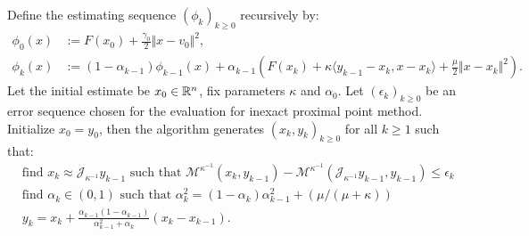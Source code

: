 \documentclass[12pt]{article}
\begin{document}
    \begin{definition}
        Define the estimating sequence $(\phi_k)_{k \ge0}$ recursively by: 
        \begin{align*}
            \phi_0(x) &:= F(x_0) + \frac{\gamma_0}{2}\Vert x - v_0\Vert^2, 
            \\
            \phi_k(x) &:= 
            (1 - \alpha_{k - 1})\phi_{k - 1}(x)
            + \alpha_{k - 1}\left(
                F(x_k) + \kappa\langle y_{k - 1} - x_k, x - x_k \rangle
                + \frac{\mu}{2}\Vert x - x_k\Vert^2
            \right). 
        \end{align*}
        Let the initial estimate be $x_0 \in \mathbb R^n$, fix parameters $\kappa$ and $\alpha_0$. 
        Let $(\epsilon_k)_{k \ge 0}$ be an error sequence chosen for the evaluation for inexact proximal point method. 
        Initialize $x_0 = y_0$, then the algorithm generates $(x_k, y_k)_{k\ge 0}$ for all $k \ge 1$ such that: 
        \begin{align*}
            & \text{find } x_k \approx \mathcal J_{\kappa^{-1}} y_{k - 1} \text{ such that } \mathcal M^{\kappa^{-1}}(x_k, y_{k - 1}) - \mathcal M^{\kappa^{-1}}(\mathcal J_{\kappa^{-1}}y_{k - 1}, y_{k - 1}) \le \epsilon_k
            \\
            & \text{find } \alpha_k \in (0, 1) \text{ such that } \alpha_k^2 = (1 - \alpha_k)\alpha_{k - 1}^2 + (\mu/(\mu + \kappa)) 
            \\
            & 
            y_{k} = x_k + \frac{\alpha_{k - 1}(1 - \alpha_{k - 1})}{\alpha_{k - 1}^2 + \alpha_k}(x_k - x_{k - 1}). 
        \end{align*}
    \end{definition}
\end{document}
